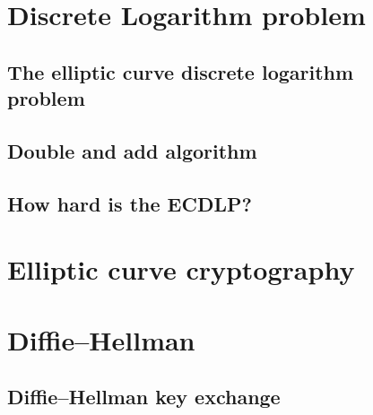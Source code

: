 \documentclass[12pt,a4paper]{report}
\begin{document}
\section{Discrete Logarithm problem}
\subsection{The elliptic curve discrete logarithm \\ problem}
\subsection{Double and add algorithm}
\subsection{How hard is the ECDLP?}
\section{Elliptic curve cryptography}
\section{Diﬃe–Hellman}
\subsection{Diﬃe–Hellman key exchange}
\cleardoublepage
	

\cite{hoffstein2008introduction}
	
	


	 
	
\end{document}
